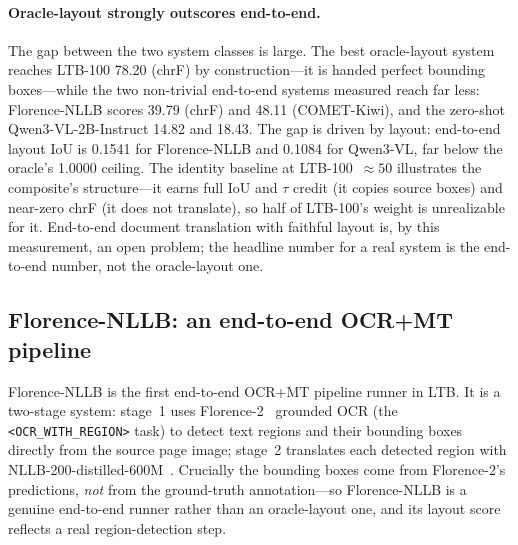\documentclass[11pt]{article}
\begin{document}
\paragraph{Oracle-layout strongly outscores end-to-end.} The gap between the two
system classes is large. The best oracle-layout system reaches LTB-100 78.20
(chrF) by construction---it is handed perfect bounding boxes---while the two
non-trivial end-to-end systems measured reach far less: Florence-NLLB scores
39.79 (chrF) and 48.11 (COMET-Kiwi), and the zero-shot Qwen3-VL-2B-Instruct
14.82 and 18.43. The gap is driven by layout: end-to-end layout IoU is 0.1541
for Florence-NLLB and 0.1084 for Qwen3-VL, far below the oracle's 1.0000
ceiling. The identity baseline at
LTB-100~$\approx 50$ illustrates the composite's structure---it earns full IoU
and $\tau$ credit (it copies source boxes) and near-zero chrF (it does not
translate), so half of LTB-100's weight is unrealizable for it. End-to-end
document translation with faithful layout is, by this measurement, an open
problem; the headline number for a real system is the end-to-end number, not the
oracle-layout one.

\subsection{Florence-NLLB: an end-to-end OCR+MT pipeline}
\label{sec:florence}

Florence-NLLB is the first end-to-end OCR+MT pipeline runner in LTB. It is a
two-stage system: stage~1 uses Florence-2~\citep{xiao2024florence2} grounded OCR
(the \texttt{<OCR\_WITH\_REGION>} task) to detect text regions and their
bounding boxes directly from the source page image; stage~2 translates each
detected region with NLLB-200-distilled-600M~\citep{nllb2022}. Crucially the
bounding boxes come from Florence-2's predictions, \emph{not} from the
ground-truth annotation---so Florence-NLLB is a genuine end-to-end runner rather
than an oracle-layout one, and its layout score reflects a real region-detection
step.
\end{document}
